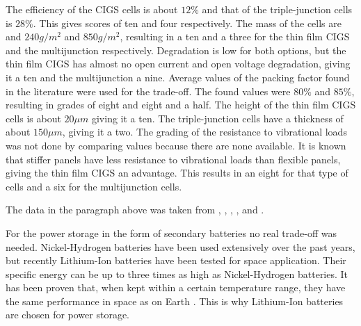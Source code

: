 The efficiency of the CIGS cells is about $12\%$ and that of the triple-junction cells is $28\%$. This gives scores of ten and four respectively.
The mass of the cells are and $240g/m^2$ and $850g/m^2$, resulting in a ten and a three for the thin film CIGS and the multijunction respectively.
Degradation is low for both options, but the thin film CIGS has almost no open current and open voltage degradation, giving it a ten and the multijunction a nine. Average values of the packing factor found in the literature were used for the trade-off. The found values were $80\%$ and $85\%$, resulting in grades of eight and eight and a half. The height of the thin film CIGS cells is about $20\mu m$ giving it a ten. The triple-junction cells have a thickness of about $150\mu m$, giving it a two.
The grading of the resistance to vibrational loads was not done by comparing values because there are none available. It is known that stiffer panels have less resistance to vibrational loads than flexible panels, giving the thin film CIGS an advantage. This results in an eight for that type of cells and a six for the multijunction cells.

The data in the paragraph above was taken from \cite{esa_telecomm}, \cite{delfi_c3}, \cite{dutchspace}, \cite{spectrolab}, \cite{cubesatshop} and \cite{azurspace}.

For the power storage in the form of secondary batteries no real trade-off was needed. Nickel-Hydrogen batteries have been used extensively over the past years, but recently Lithium-Ion batteries have been tested for space application. Their specific energy can be up to three times as high as Nickel-Hydrogen batteries. It has been proven that, when kept within a certain temperature range, they have the same performance in space as on Earth \cite{LEO_li_ion}. This is why Lithium-Ion batteries are chosen for power storage.
\clearpage